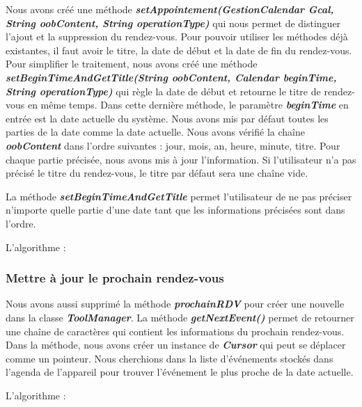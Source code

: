 \indent Nous avons créé une méthode \textbf{\emph{setAppointement(GestionCalendar Gcal, String oobContent, String operationType)}} qui nous permet de distinguer l'ajout et la suppression du rendez-vous. Pour pouvoir utiliser les méthodes déjà existantes, il faut avoir le titre, la date de début et la date de fin du rendez-vous. Pour simplifier le traitement, nous avons créé une méthode \textbf{\emph{setBeginTimeAndGetTitle(String oobContent, Calendar beginTime, String operationType)}} qui règle la date de début et retourne le titre de rendez-vous en même temps. Dans cette dernière méthode, le paramètre \textbf{\emph{beginTime}} en entrée est la date actuelle du système. Nous avons mis par défaut toutes les parties de la date comme la date actuelle. Nous avons vérifié la chaîne \textbf{\emph{oobContent}} dans l'ordre suivantes : jour, mois, an, heure, minute, titre. Pour chaque partie précisée, nous avons mis à jour l'information. Si l'utilisateur n'a pas précisé le titre du rendez-vous, le titre par défaut sera une chaîne vide.

\indent La méthode \textbf{\emph{setBeginTimeAndGetTitle}} permet l'utilisateur de ne pas préciser n'importe quelle partie d'une date tant que les informations précisées sont dans l'ordre.

\indent L'algorithme :\\




\subsubsection*{Mettre à jour le prochain rendez-vous}

\indent Nous avons aussi supprimé la méthode \textbf{\emph{prochainRDV}} pour créer une nouvelle dans la classe \textbf{\emph{ToolManager}}. La méthode \textbf{\emph{getNextEvent()}} permet de retourner une chaîne de caractères qui contient les informations du prochain rendez-vous. Dans la méthode, nous avons créer un instance de \textbf{\emph{Cursor}} qui peut se déplacer comme un pointeur. Nous cherchions dans la liste d'événements stockés dans l'agenda de l'appareil pour trouver l'événement le plus proche de la date actuelle.

\indent L'algorithme :\\


